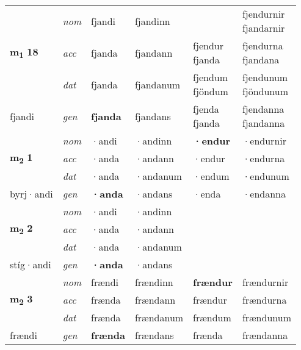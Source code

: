 \begin{longtable}[l]{X>{\footnotesize\itshape}XXXXX}
\multirow{3}{*}{{{\textbf{m{\textsubscript{1}}} \Large{\textbf{18}}}}} & nom & fjandi & fjandinn & \textbf{\specialcell{fjendur\\ fjandar}} & \specialcell{fjendurnir\\ fjandarnir} \\*
 & acc & fjanda & fjandann & \specialcell{fjendur\\ fjanda} & \specialcell{fjendurna\\ fjandana} \\*
 & dat & fjanda & fjandanum & \specialcell{fjendum\\ fjöndum} & \specialcell{fjendunum\\ fjöndunum} \\*
 {\footnotesize{fjandi}} & gen & \textbf{fjanda} & fjandans & \specialcell{fjenda\\ fjanda} & \specialcell{fjendanna\\ fjandanna} \\
\cmidrule{1-6}

\multirow{3}{*}{{{\textbf{m{\textsubscript{2}}} \Large{\textbf{1}}}}} & nom & ·andi & ·andinn & \textbf{·endur} & ·endurnir \\*
 & acc & ·anda & ·andann & ·endur & ·endurna \\*
 & dat & ·anda & ·andanum & ·endum & ·endunum \\*
 {\footnotesize{byrj\allowbreak ·andi}} & gen & \textbf{·anda} & ·andans & ·enda & ·endanna \\
\cmidrule{1-6}

\multirow{3}{*}{{{\textbf{m{\textsubscript{2}}} \Large{\textbf{2}}}}} & nom & ·andi & ·andinn & \textbf{} &  \\*
 & acc & ·anda & ·andann &  &  \\*
 & dat & ·anda & ·andanum &  &  \\*
 {\footnotesize{stíg\allowbreak ·andi}} & gen & \textbf{·anda} & ·andans &  &  \\
\cmidrule{1-6}

\multirow{3}{*}{{{\textbf{m{\textsubscript{2}}} \Large{\textbf{3}}}}} & nom & frændi & frændinn & \textbf{frændur} & frændurnir \\*
 & acc & frænda & frændann & frændur & frændurna \\*
 & dat & frænda & frændanum & frændum & frændunum \\*
 {\footnotesize{frændi}} & gen & \textbf{frænda} & frændans & frænda & frændanna \\


\end{longtable}
